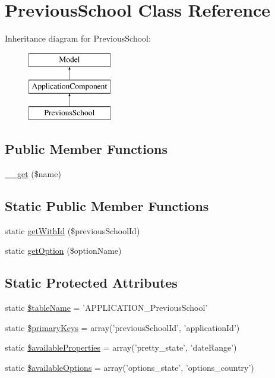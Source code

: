 \hypertarget{class_previous_school}{\section{Previous\-School Class Reference}
\label{class_previous_school}
}
Inheritance diagram for Previous\-School\-:\begin{figure}[H]
\begin{center}
\leavevmode
\includegraphics[height=3.000000cm]{class_previous_school}
\end{center}
\end{figure}
\subsection*{Public Member Functions}
\begin{DoxyCompactItemize}
\item 
\hyperlink{class_previous_school_a422c2af63cdc3c749ed00ae2dd4675b9}{\-\_\-\-\_\-get} (\$name)
\end{DoxyCompactItemize}
\subsection*{Static Public Member Functions}
\begin{DoxyCompactItemize}
\item 
static \hyperlink{class_previous_school_a2f500adfc12f66546f44ce8c31ed2365}{get\-With\-Id} (\$previous\-School\-Id)
\item 
static \hyperlink{class_previous_school_a52c00ae6df32a1b270ca037b707875d4}{get\-Option} (\$option\-Name)
\end{DoxyCompactItemize}
\subsection*{Static Protected Attributes}
\begin{DoxyCompactItemize}
\item 
static \hyperlink{class_previous_school_a7a1b6c14d9780c99bd44f53abc4d8266}{\$table\-Name} = 'A\-P\-P\-L\-I\-C\-A\-T\-I\-O\-N\-\_\-\-Previous\-School'
\item 
static \hyperlink{class_previous_school_a07895b26cd4d09b5fa9487179a046d7e}{\$primary\-Keys} = array('previous\-School\-Id', 'application\-Id')
\item 
static \hyperlink{class_previous_school_ac6fc68cec7b9b52c7fb37f76538b6d40}{\$available\-Properties} = array('pretty\-\_\-state', 'date\-Range')
\item 
static \hyperlink{class_previous_school_a709b38f9ebb9b1d8a0a7d4a970e4952d}{\$available\-Options} = array('options\-\_\-state', 'options\-\_\-country')
\end{DoxyCompactItemize}
